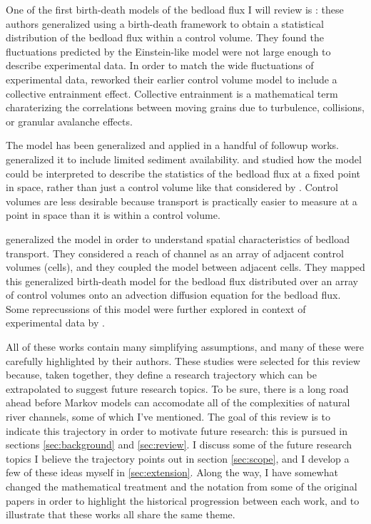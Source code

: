 One of the first birth-death models of the bedload flux I will review is \citet{Ancey2006}: these authors generalized \citet{Einstein1950} using a birth-death framework to obtain a statistical distribution of the bedload flux within a control volume. 
They found the fluctuations predicted by the Einstein-like model were not large enough to describe experimental data.  
In order to match the wide fluctuations of experimental data, \citet{Ancey2008} reworked their earlier control volume model to include a collective entrainment effect.
Collective entrainment is a mathematical term charaterizing the correlations between moving grains due to turbulence, collisions, or granular avalanche effects.

The \citet{Ancey2008} model has been generalized and applied in a handful of followup works. 
\citet{Turowski2009} generalized it to include limited sediment availability. 
\citet{Heyman2013} and \citet{Ma2014} studied how the \citet{Ancey2008} model could be interpreted to describe the statistics of the bedload flux at a fixed point in space, rather than just a control volume like that considered by \citet{Einstein1950}. 
Control volumes are less desirable because transport is practically easier to measure at a point in space than it is within a control volume. 

\citet{Ancey2014, Ancey2015} generalized the \citet{Ancey2008} model in order to understand spatial characteristics of bedload transport. 
They considered a reach of channel as an array of adjacent control volumes (cells), and they coupled the \citet{Ancey2008} model between adjacent cells. 
They mapped this generalized birth-death model for the bedload flux distributed over an array of control volumes onto an advection diffusion equation for the bedload flux. 
Some reprecussions of this model were further explored in context of experimental data by \citet{Heyman2014}. 

All of these works contain many simplifying assumptions, and many of these were carefully highlighted by their authors. 
These studies were selected for this review because, taken together, they define a research trajectory which can be extrapolated to suggest future research topics. 
To be sure, there is a long road ahead before Markov models can accomodate all of the complexities of natural river channels, some of which I've mentioned. 
The goal of this review is to indicate this trajectory in order to motivate future research: this is pursued in sections \ref{sec:background} and \ref{sec:review}. 
I discuss some of the future research topics I believe the trajectory points out in section \ref{sec:scope}, and I develop a few of these ideas myself in \ref{sec:extension}. 
Along the way, I have somewhat changed the mathematical treatment and the notation from some of the original papers in order to highlight the historical progression between each work, and to illustrate that these works all share the same theme.  




